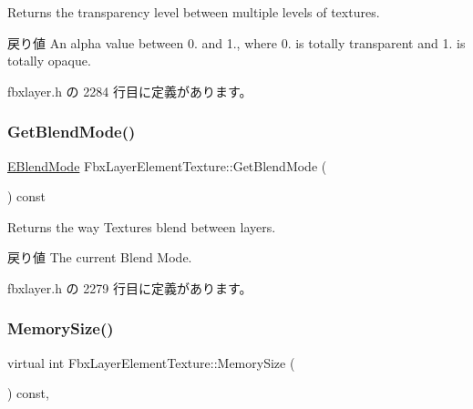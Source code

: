 Returns the transparency level between multiple levels of textures. \begin{DoxyReturn}{戻り値}
An alpha value between 0. and 1., where 0. is totally transparent and 1. is totally opaque. 
\end{DoxyReturn}


 fbxlayer.\+h の 2284 行目に定義があります。

\mbox{\label{class_fbx_layer_element_texture_aa4ddd6daddc1785bb6ccf579545b5ff3}} 
\subsubsection{\texorpdfstring{Get\+Blend\+Mode()}{GetBlendMode()}}
{\footnotesize\ttfamily \hyperlink{class_fbx_layer_element_texture_a95d9277da243733eae14d4d0141f77ea}{E\+Blend\+Mode} Fbx\+Layer\+Element\+Texture\+::\+Get\+Blend\+Mode (\begin{DoxyParamCaption}{ }\end{DoxyParamCaption}) const\hspace{0.3cm}{\ttfamily [inline]}}

Returns the way Textures blend between layers. \begin{DoxyReturn}{戻り値}
The current Blend Mode. 
\end{DoxyReturn}


 fbxlayer.\+h の 2279 行目に定義があります。

\mbox{\label{class_fbx_layer_element_texture_aa6ee4c7c56a71d1a3f70fa4e0806e1f5}} 
\subsubsection{\texorpdfstring{Memory\+Size()}{MemorySize()}}
{\footnotesize\ttfamily virtual int Fbx\+Layer\+Element\+Texture\+::\+Memory\+Size (\begin{DoxyParamCaption}{ }\end{DoxyParamCaption}) const\hspace{0.3cm}{\ttfamily [inline]}, {\ttfamily [virtual]}}



